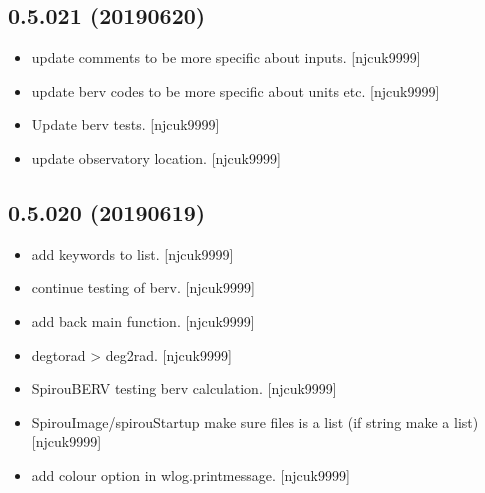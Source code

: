 \documentclass[a4paper,10pt,english]{report}
\begin{document}
\subsection{0.5.021 (2019\sphinxhyphen{}06\sphinxhyphen{}20)}
\label{\detokenize{misc/changelog:id135}}\begin{itemize}
\item {} 
 \sphinxhyphen{} update comments to be more specific about inputs.
{[}njcuk9999{]}

\item {} 
 \sphinxhyphen{} update berv codes to be more specific about units etc.
{[}njcuk9999{]}

\item {} 
Update berv tests. {[}njcuk9999{]}

\item {} 
 \sphinxhyphen{} update observatory location. {[}njcuk9999{]}

\end{itemize}


\subsection{0.5.020 (2019\sphinxhyphen{}06\sphinxhyphen{}19)}
\label{\detokenize{misc/changelog:id136}}\begin{itemize}
\item {} 
 \sphinxhyphen{} add keywords to list. {[}njcuk9999{]}

\item {} 
 \sphinxhyphen{} continue testing of berv. {[}njcuk9999{]}

\item {} 
 \sphinxhyphen{} add back main function. {[}njcuk9999{]}

\item {} 
 \sphinxhyphen{} degtorad \textendash{}\textgreater{} deg2rad. {[}njcuk9999{]}

\item {} 
SpirouBERV \sphinxhyphen{} testing berv calculation. {[}njcuk9999{]}

\item {} 
SpirouImage/spirouStartup \sphinxhyphen{} make sure files is a list (if string make
a list) {[}njcuk9999{]}

\item {} 
 \sphinxhyphen{} add colour option in wlog.printmessage. {[}njcuk9999{]}

\end{itemize}
\end{document}
